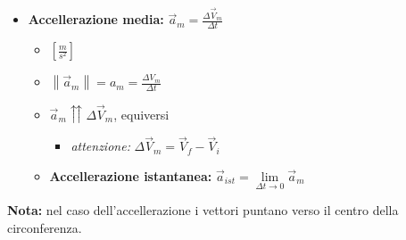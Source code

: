 \documentclass[../main.tex]{subfiles}
\begin{document}
\vspace{1.25cm}
\begin{itemize}
    \item \textbf{Accellerazione media:} $\vec{a}_m = \frac{\Delta \vec{V}_m}{\Delta t}$
    \begin{itemize}
        \item $[\frac{m}{s^2}]$
        \item $\left\lVert \vec{a}_m\right\rVert = a_m = \frac{\Delta V_m}{\Delta t} $
        \item $\vec{a}_m\upuparrows \Delta\vec{V}_m$, equiversi
        \begin{itemize}
            \item \textit{attenzione:} $\Delta \vec{V}_m = \vec{V}_f - \vec{V}_i$
        \end{itemize}
        \item \textbf{Accellerazione istantanea:} $\vec{a}_{ist} = \lim\limits_{\Delta t \to 0}\vec{a}_m $
    \end{itemize}
\end{itemize}
\textbf{Nota:} nel caso dell'accellerazione i vettori puntano verso il centro della circonferenza.
\end{document}
